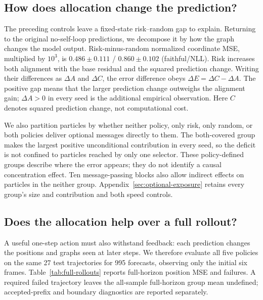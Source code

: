 \subsection{How does allocation change the prediction?}
The preceding controls leave a fixed-state risk--random gap to explain. Returning to the original no-self-loop predictions, we decompose it by how the graph changes the model output. Risk-minus-random normalized coordinate MSE, multiplied by $10^3$, is $0.486\pm0.111$ / $0.860\pm0.102$ (faithful/NLL). Risk increases both alignment with the base residual and the squared prediction change. Writing their differences as $\Delta A$ and $\Delta C$, the error difference obeys $\Delta E=\Delta C-\Delta A$. The positive gap means that the larger prediction change outweighs the alignment gain; $\Delta A>0$ in every seed is the additional empirical observation. Here $C$ denotes squared prediction change, not computational cost.

We also partition particles by whether neither policy, only risk, only random, or both policies deliver optional messages directly to them. The both-covered group makes the largest positive unconditional contribution in every seed, so the deficit is not confined to particles reached by only one selector. These policy-defined groups describe where the error appears; they do not identify a causal concentration effect. Ten message-passing blocks also allow indirect effects on particles in the neither group. Appendix~\ref{sec:optional-exposure} retains every group's size and contribution and both speed controls.

\subsection{Does the allocation help over a full rollout?}
A useful one-step action must also withstand feedback: each prediction changes the positions and graphs seen at later steps. We therefore evaluate all five policies on the same 27 test trajectories for 995 forecasts, observing only the initial six frames. Table~\ref{tab:full-rollouts} reports full-horizon position MSE and failures. A required failed trajectory leaves the all-sample full-horizon group mean undefined; accepted-prefix and boundary diagnostics are reported separately.

